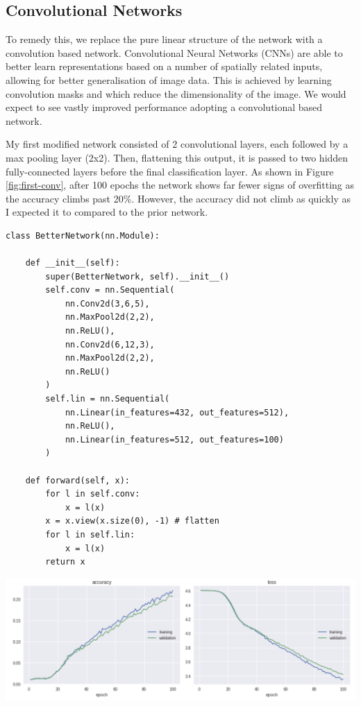 \documentclass[11pt]{article}
\begin{document}
\subsection{Convolutional Networks}

To remedy this, we replace the pure linear structure of the network with a convolution based network. Convolutional Neural Networks (CNNs) are able to better learn representations based on a number of spatially related inputs, allowing for better generalisation of image data. This is achieved by learning convolution masks and which reduce the dimensionality of the image. We would expect to see vastly improved performance adopting a convolutional based network.

My first modified network consisted of 2 convolutional layers, each followed by a max pooling layer (2x2). Then, flattening this output, it is passed to two hidden fully-connected layers before the final classification layer. As shown in Figure \ref{fig:first-conv}, after 100 epochs the network shows far fewer signs of overfitting as the accuracy climbs past 20\%. However, the accuracy did not climb as quickly as I expected it to compared to the prior network.

\begin{small}
\begin{verbatim}
class BetterNetwork(nn.Module):

    def __init__(self):
        super(BetterNetwork, self).__init__()
        self.conv = nn.Sequential(
            nn.Conv2d(3,6,5),
            nn.MaxPool2d(2,2),
            nn.ReLU(),
            nn.Conv2d(6,12,3),
            nn.MaxPool2d(2,2),
            nn.ReLU()
        )
        self.lin = nn.Sequential(
            nn.Linear(in_features=432, out_features=512),
            nn.ReLU(),
            nn.Linear(in_features=512, out_features=100)
        )

    def forward(self, x):
        for l in self.conv:
            x = l(x)
        x = x.view(x.size(0), -1) # flatten
        for l in self.lin:
            x = l(x)
        return x
\end{verbatim}
\end{small}


    \begin{center}
        \begin{minipage}{0.75\linewidth}
            \includegraphics[width=\linewidth]{accuracy1}
            \label{fig:first-conv}
        \end{minipage}%
    \end{center}
    
\end{document}
